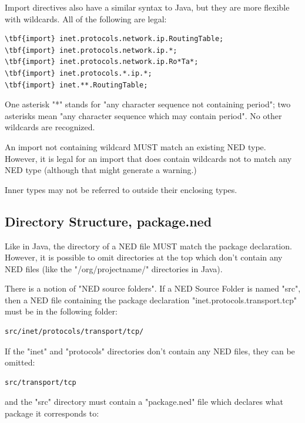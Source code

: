 Import directives also have a similar syntax to Java, but they
are more flexible with wildcards. All of the following are legal:

\begin{Verbatim}[commandchars=\\\{\}]
\tbf{import} inet.protocols.network.ip.RoutingTable;
\tbf{import} inet.protocols.network.ip.*;
\tbf{import} inet.protocols.network.ip.Ro*Ta*;
\tbf{import} inet.protocols.*.ip.*;
\tbf{import} inet.**.RoutingTable;
\end{Verbatim}

One asterisk "*" stands for "any character sequence not containing
period"; two asterisks mean "any character sequence which may
contain period". No other wildcards are recognized.

An import not containing wildcard MUST match an existing NED type.
However, it is legal for an import that does contain wildcards
not to match any NED type (although that might generate a warning.)

Inner types may not be referred to outside their enclosing types.


\subsection{Directory Structure, package.ned}

Like in Java, the directory of a NED file MUST match the package declaration.
However, it is possible to omit directories at the top which don't
contain any NED files (like the "/org/projectname/" directories in Java).

There is a notion of "NED source folders". If a NED Source Folder is
named "src", then a NED file containing the package declaration
"inet.protocols.transport.tcp" must be in the following folder:

\begin{Verbatim}[commandchars=\\\{\}]
src/inet/protocols/transport/tcp/
\end{Verbatim}

If the "inet" and "protocols" directories don't contain any NED files,
they can be omitted:

\begin{Verbatim}[commandchars=\\\{\}]
src/transport/tcp
\end{Verbatim}

and the "src" directory must contain a "package.ned" file which declares
what package it corresponds to:

